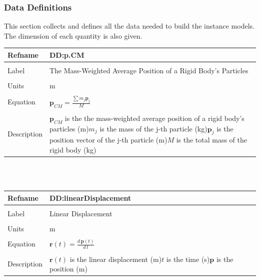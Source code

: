 \documentclass[12pt]{article}
\begin{document}
\subsubsection{Data Definitions}
\label{Sec:DDs}
This section collects and defines all the data needed to build the instance models. The dimension of each quantity is also given.
~\newline
\noindent \begin{minipage}{\textwidth}
\begin{tabular}{p{} p{}}
\toprule \textbf{Refname} & \textbf{DD:p.CM}
\label{DD:p.CM}
\\ \midrule \\
Label & The Mass-Weighted Average Position of a Rigid Body's Particles
\\ \midrule \\
Units & m
\\ \midrule \\
Equation & ${\mathbf{p}_{CM}}=\frac{\displaystyle\sum{{m_{j}} {\mathbf{p}_{j}}}}{M}$
\\ \midrule \\
Description & ${\mathbf{p}_{CM}}$ is the the mass-weighted average position of a rigid body's particles (m)\newline${m_{j}}$ is the mass of the j-th particle (kg)\newline${\mathbf{p}_{j}}$ is the position vector of the j-th particle (m)\newline$M$ is the total mass of the rigid body (kg)
\\ \bottomrule \end{tabular}
\end{minipage}\\
~\newline
\noindent \begin{minipage}{\textwidth}
\begin{tabular}{p{} p{}}
\toprule \textbf{Refname} & \textbf{DD:linearDisplacement}
\label{DD:linearDisplacement}
\\ \midrule \\
Label & Linear Displacement
\\ \midrule \\
Units & m
\\ \midrule \\
Equation & $\mathbf{r}(t)=\frac{d\,\mathbf{p}\left(t\right)}{d\,t}$
\\ \midrule \\
Description & $\mathbf{r}(t)$ is the linear displacement (m)\newline$t$ is the time (s)\newline$\mathbf{p}$ is the position (m)
\\ \bottomrule \end{tabular}
\end{minipage}\\
\end{document}
